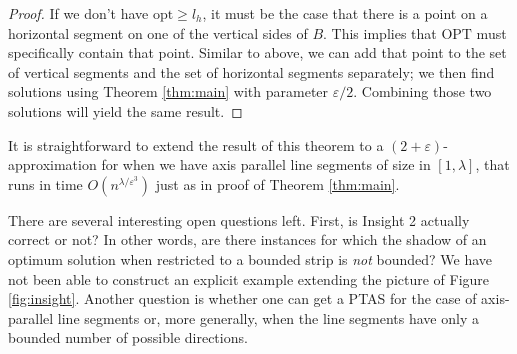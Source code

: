 \documentclass[10pt,a4paper]{amsart}
\theoremstyle{thmstyleone}
\newcommand{\eps}{\varepsilon}
\newcommand{\opt}{{\text{opt}}}
\newcommand{\OPT}{{\text{OPT}}}
\begin{document}
\begin{proof}
    If we don't have $ \opt \ge l_h $, it must be the case that there is a point on a horizontal segment on one of the vertical sides of $ B $. This implies that $ \OPT $ must specifically contain that point. Similar to above, we can add that point to the set of vertical segments and the set of horizontal segments separately; we then find solutions using Theorem \ref{thm:main} with parameter $ \eps/2 $. Combining those two solutions will yield the same result.
\end{proof}

It is straightforward to extend the result  of this theorem to a $(2+\eps)$-approximation for when we have axis parallel line segments of size in $[1,\lambda]$, that runs in time $O(n^{\lambda/\eps^3})$ just as in proof of Theorem \ref{thm:main}.

There are several interesting open questions left. First, is Insight 2 actually correct or not? In other words, are there instances for which the shadow of an optimum solution when restricted to a bounded strip is {\em not} bounded? We have not been able to construct an explicit example extending the picture of Figure \ref{fig:insight}.
Another question is whether one can get a PTAS for the case of axis-parallel line segments or, more generally, when the line segments have only a bounded number of possible directions.


\end{document}
